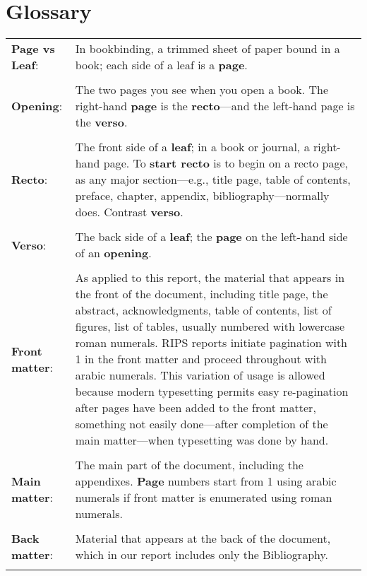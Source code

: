 \chapter{Glossary}\label{Glossary}

\begin{table}[!h]  %
\begin{tabular}{ p{} p{} }

{\bf Page vs Leaf}:  &    In bookbinding, a trimmed sheet of paper bound in a book; each side of a leaf is a {\bf page}.\\  \\

{\bf Opening}:  &   The two pages you see when you open a book.  The right-hand {\bf page} is the {\bf recto}---and the left-hand page is the {\bf verso}.\\  \\


{\bf Recto}:  &  The front side of a {\bf leaf}; in a book or journal, a right-hand page.  To {\bf start recto} is to begin on a recto page, as any major section---e.g., title page, table of contents,  preface, chapter, appendix, bibliography---normally does. Contrast {\bf verso}.  \\  \\

{\bf Verso}:  &  The back side of a {\bf leaf}; the {\bf page} on the left-hand side of an {\bf opening}.\\  \\


{\bf Front matter}:  &  As applied to this report, the material that appears in the front of the document, including title page, the abstract, acknowledgments,  table of contents, list of figures, list of tables, usually numbered with lowercase roman numerals. RIPS reports initiate pagination with 1 in the front matter and proceed throughout with arabic numerals.
This variation of usage is allowed because modern typesetting permits easy re-pagination after pages have been added to the front matter, something not easily done---after completion of the main matter---when typesetting was done by hand.
 \\  \\


{\bf Main matter}: &  The main part of the document, including the appendixes.  {\bf Page} numbers start from 1 using arabic numerals if front matter is  enumerated using roman numerals. \\  \\

{\bf Back matter}: &  Material that appears at the back of the document, which in our report includes only the Bibliography. \\  \\

\end{tabular}
\end{table}

\endinput
